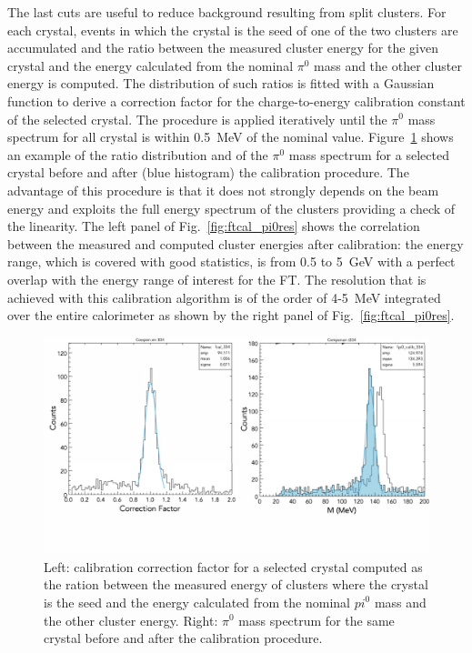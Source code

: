The last cuts are useful to reduce background resulting from split clusters.  For each crystal, events in which the
crystal is the seed of one of the two clusters are accumulated and the ratio between the measured cluster energy
for the given crystal and the energy calculated from the nominal $\pi^0$ mass and the other cluster energy is
computed. The distribution of such ratios is fitted with a Gaussian function to derive a correction factor for the
charge-to-energy calibration constant of the selected crystal. The procedure is applied iteratively until the $\pi^0$
mass spectrum for all crystal is within 0.5~MeV of the nominal value. Figure~\ref{fig:ftcal_pi0} shows an example of
the ratio distribution and of the $\pi^0$ mass spectrum for a selected crystal before and after (blue histogram)
the calibration procedure. The advantage of this procedure is that it does not strongly depends on the beam energy
and exploits the full energy spectrum of the clusters providing a check of the linearity. The left panel of
Fig.~\ref{fig:ftcal_pi0res} shows the  correlation between the measured and computed cluster energies after
calibration: the energy range, which is covered with good statistics, is from 0.5 to 5~GeV with a perfect overlap with
the energy range of interest for the FT. The resolution that is achieved with this calibration algorithm is of the order
of 4-5~MeV integrated over the entire calorimeter as  shown by the right panel of Fig.~\ref{fig:ftcal_pi0res}.

\begin{figure}
\includegraphics[height=0.46\columnwidth]{fig/ftcal_pi0.pdf}
\caption{Left: calibration correction factor for a selected crystal computed as the ration between the measured
  energy of clusters where the crystal is the seed and the energy calculated from the nominal $pi^0$ mass and the
  other cluster energy. Right: $\pi^0$ mass spectrum for the same crystal before and after the calibration procedure.}
\label{fig:ftcal_pi0}
\end{figure}

